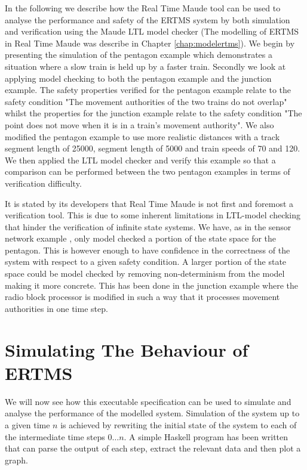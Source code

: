 \label{chapter:verifyertms}\label{chap:verifyertms}


In the following we describe how the Real Time Maude tool can be used to analyse the performance and safety of the ERTMS system by both simulation and verification using the Maude LTL model checker (The modelling of ERTMS in Real Time Maude was describe in Chapter \ref{chap:modelertms}).  We begin by presenting the simulation of the pentagon example which demonstrates a situation where a slow train is held up by a faster train. Secondly we look at applying model checking to both the pentagon example and the junction example. The safety properties verified for the pentagon example relate to the safety condition "The movement authorities of the two trains do not overlap" whilst the properties for the junction example relate to the safety condition "The point does not move when it is in a train's movement authority". We also modified the pentagon example to use more realistic distances with a track segment length of 25000, segment length of 5000 and train speeds of 70 and 120.  We then applied the LTL model checker and verify this example so that a comparison can be performed between the two pentagon examples in terms of verification difficulty.

It is stated by its developers that Real Time Maude is not first and foremost a verification tool. This is due to some inherent limitations in LTL-model checking that hinder the verification of infinite state systems. We have, as in the sensor network example \cite{PO07}, only model checked a portion of the state space for the pentagon. This is however enough to have confidence in the correctness of the system with respect to a given safety condition. A larger portion of the state space could be model checked by removing non-determinism from the model making it more concrete. This has been done in the junction example where the radio block processor is modified in such a way that it processes movement authorities in one time step.


\section{Simulating The Behaviour of ERTMS}

We will now see how this executable specification can be used to simulate and analyse the performance of the modelled system. Simulation of the system up to a given time $n$ is achieved by rewriting the initial state of the system to each of the intermediate time steps $0 \ldots n$. A simple Haskell program has been written that can parse the output of each step, extract the relevant data and then plot a graph.

